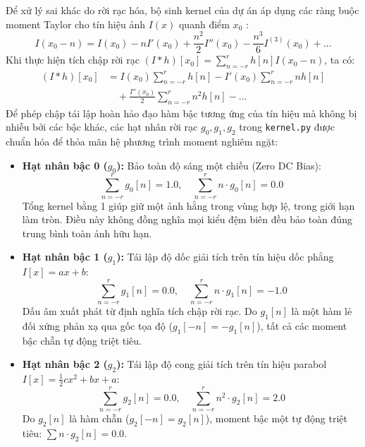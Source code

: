 \documentclass[conference]{IEEEtran}
\begin{document}
Để xử lý sai khác do rời rạc hóa, bộ sinh kernel của dự án áp dụng các ràng buộc moment Taylor cho tín hiệu ảnh $I(x)$ quanh điểm $x_0$ \cite{xlaRepository}:
\begin{equation}
I(x_0 - n) = I(x_0) - n I'(x_0) + \frac{n^2}{2} I''(x_0) - \frac{n^3}{6} I^{(3)}(x_0) + \dots
\end{equation}
Khi thực hiện tích chập rời rạc $(I * h)[x_0] = \sum_{n=-r}^r h[n] I(x_0 - n)$, ta có:
\begin{align}
(I * h)[x_0] &= I(x_0) \sum_{n=-r}^r h[n] - I'(x_0) \sum_{n=-r}^r n h[n] \nonumber \\
&\quad + \frac{I''(x_0)}{2} \sum_{n=-r}^r n^2 h[n] - \dots
\end{align}
Để phép chập tái lập hoàn hảo đạo hàm bậc tương ứng của tín hiệu mà không bị nhiễu bởi các bậc khác, các hạt nhân rời rạc $g_0, g_1, g_2$ trong \texttt{kernel.py} được chuẩn hóa để thỏa mãn hệ phương trình moment nghiêm ngặt:
\begin{itemize}
    \item \textbf{Hạt nhân bậc 0 ($g_0$):} Bảo toàn độ sáng một chiều (Zero DC Bias):
    \begin{equation}
    \sum_{n=-r}^r g_0[n] = 1.0, \quad \sum_{n=-r}^r n \cdot g_0[n] = 0.0
    \end{equation}
    Tổng kernel bằng 1 giúp giữ một ảnh hằng trong vùng hợp lệ, trong giới hạn làm tròn. Điều này không đồng nghĩa mọi kiểu đệm biên đều bảo toàn đúng trung bình toàn ảnh hữu hạn.
    \item \textbf{Hạt nhân bậc 1 ($g_1$):} Tái lập độ dốc giải tích trên tín hiệu dốc phẳng $I[x] = ax + b$:
    \begin{equation}
    \sum_{n=-r}^r g_1[n] = 0.0, \quad \sum_{n=-r}^r n \cdot g_1[n] = -1.0
    \end{equation}
    Dấu âm xuất phát từ định nghĩa tích chập rời rạc. Do $g_1[n]$ là một hàm lẻ đối xứng phản xạ qua gốc tọa độ ($g_1[-n] = -g_1[n]$), tất cả các moment bậc chẵn tự động triệt tiêu.
    \item \textbf{Hạt nhân bậc 2 ($g_2$):} Tái lập độ cong giải tích trên tín hiệu parabol $I[x] = \frac{1}{2} c x^2 + bx + a$:
    \begin{equation}
    \sum_{n=-r}^r g_2[n] = 0.0, \quad \sum_{n=-r}^r n^2 \cdot g_2[n] = 2.0
    \end{equation}
    Do $g_2[n]$ là hàm chẵn ($g_2[-n] = g_2[n]$), moment bậc một tự động triệt tiêu: $\sum n \cdot g_2[n] = 0.0$.
\end{itemize}
\end{document}

